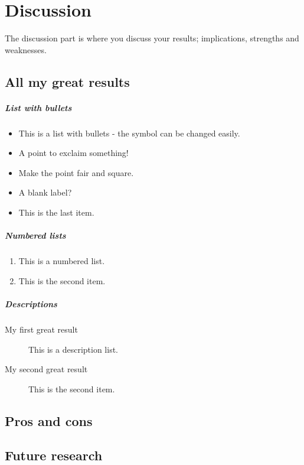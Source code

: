 \chapter{Discussion}
\label{discussion}
The discussion part is where you discuss your results; implications, strengths and weaknesses. 
\section{All my great results}

\paragraph{List with bullets}
\begin{itemize}
    \item This is a list with bullets - the symbol can be changed easily.
     \item[!] A point to exclaim something!
  \item[$\blacksquare$] Make the point fair and square.
  \item[] A blank label?
    \item This is the last item.
\end{itemize}
\paragraph{Numbered lists}
\begin{enumerate}
    \item This is a numbered list.
     \item This is the second item.
\end{enumerate}
\paragraph{Descriptions}
\begin{description}
\item[My first great result] This is a description list.
 \item[My second great result] This is the second item.
\end{description}

\section{Pros and cons}

\section{Future research}
